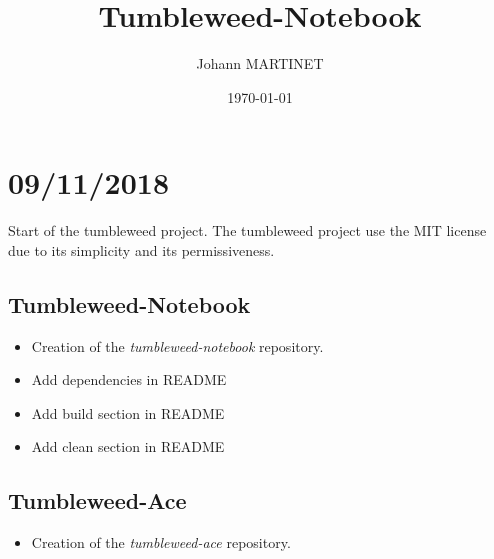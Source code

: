 

\title{Tumbleweed-Notebook}
\author{Johann MARTINET}
\date{\today}


\maketitle

\section*{09/11/2018}%
\label{sec:09_11_2018}

Start of the tumbleweed project.
The tumbleweed project use the MIT license due to its simplicity and its permissiveness.

\subsection*{Tumbleweed-Notebook}%
\begin{itemize}
        \item Creation of the \emph{tumbleweed-notebook} repository.
        \item Add dependencies in README
        \item Add build section in README
        \item Add clean section in README
\end{itemize}

\subsection*{Tumbleweed-Ace}%
\begin{itemize}
        \item Creation of the \emph{tumbleweed-ace} repository.
\end{itemize}




